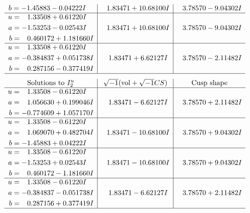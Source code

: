 \documentclass[1p]{elsarticle_modified}
\theoremstyle{definition}
\newcommand{\I}{\sqrt{-1}}
\begin{document}
$$\begin{array}{c|c|c}
\begin{aligned}
b &= -1.45883 - 0.04222 I\end{aligned}
 & \phantom{-}1.83471 + 10.68100 I & \phantom{-}3.78570 - 9.04302 I \\ \hline\begin{aligned}
u &= \phantom{-}1.33508 + 0.61220 I \\
a &= -1.53253 - 0.02543 I \\
b &= \phantom{-}0.460172 + 1.181660 I\end{aligned}
 & \phantom{-}1.83471 + 10.68100 I & \phantom{-}3.78570 - 9.04302 I \\ \hline\begin{aligned}
u &= \phantom{-}1.33508 + 0.61220 I \\
a &= -0.384837 + 0.051738 I \\
b &= \phantom{-}0.287156 - 0.377419 I\end{aligned}
 & \phantom{-}1.83471 + 6.62127 I & \phantom{-}3.78570 - 2.11482 I\\
 \hline 
 \end{array}$$\newpage$$\begin{array}{c|c|c}  
\text{Solutions to }I^u_{2}& \I (\text{vol} + \sqrt{-1}CS) & \text{Cusp shape}\\
 \hline 
\begin{aligned}
u &= \phantom{-}1.33508 - 0.61220 I \\
a &= \phantom{-}1.056630 + 0.199046 I \\
b &= -0.774609 + 1.057170 I\end{aligned}
 & \phantom{-}1.83471 - 6.62127 I & \phantom{-}3.78570 + 2.11482 I \\ \hline\begin{aligned}
u &= \phantom{-}1.33508 - 0.61220 I \\
a &= \phantom{-}1.069070 + 0.482704 I \\
b &= -1.45883 + 0.04222 I\end{aligned}
 & \phantom{-}1.83471 - 10.68100 I & \phantom{-}3.78570 + 9.04302 I \\ \hline\begin{aligned}
u &= \phantom{-}1.33508 - 0.61220 I \\
a &= -1.53253 + 0.02543 I \\
b &= \phantom{-}0.460172 - 1.181660 I\end{aligned}
 & \phantom{-}1.83471 - 10.68100 I & \phantom{-}3.78570 + 9.04302 I \\ \hline\begin{aligned}
u &= \phantom{-}1.33508 - 0.61220 I \\
a &= -0.384837 - 0.051738 I \\
b &= \phantom{-}0.287156 + 0.377419 I\end{aligned}
 & \phantom{-}1.83471 - 6.62127 I & \phantom{-}3.78570 + 2.11482 I\\
 \hline 
 \end{array}$$\newpage\newpage\renewcommand{\arraystretch}{1}
\end{document}
